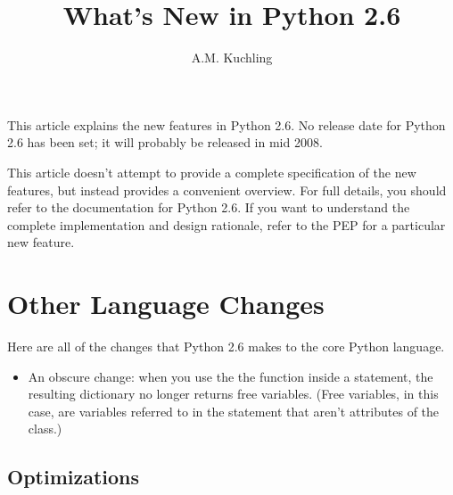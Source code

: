 \documentclass{howto}
\title{What's New in Python 2.6}
\author{A.M. Kuchling}
\begin{document}
\maketitle
\tableofcontents

This article explains the new features in Python 2.6.  No release date
for Python 2.6 has been set; it will probably be released in mid 2008.


This article doesn't attempt to provide a complete specification of
the new features, but instead provides a convenient overview.  For
full details, you should refer to the documentation for Python 2.6.
If you want to understand the complete implementation and design
rationale, refer to the PEP for a particular new feature.





\section{Other Language Changes}

Here are all of the changes that Python 2.6 makes to the core Python
language.

\begin{itemize}

\item An obscure change: when you use the the 
function inside a  statement, the resulting dictionary
no longer returns free variables.  (Free variables, in this case, are
variables referred to in the  statement 
that aren't attributes of the class.)

\end{itemize}


\subsection{Optimizations}
\end{document}
